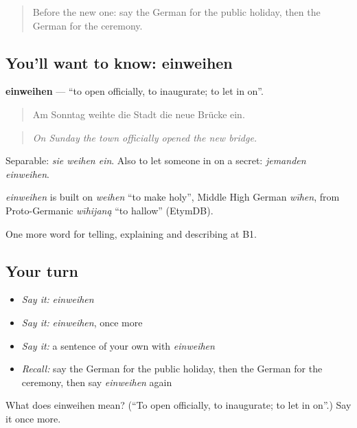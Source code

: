 \label{lesson:GE-C305-einweihen}



\begin{quote}
Before the new one: say the German for the public holiday, then the German for the ceremony.
\end{quote}

\subsection*{You'll want to know: einweihen}
\textbf{einweihen} — \textquotedblleft{}to open officially, to inaugurate; to let in on\textquotedblright{}.

\begin{quote}
Am Sonntag weihte die Stadt die neue Brücke ein.
\end{quote}

\begin{quote}
\emph{On Sunday the town officially opened the new bridge.}
\end{quote}

Separable: \emph{sie weihen ein}. Also to let someone in on a secret: \emph{jemanden einweihen}.

\begin{cousinweb}
\emph{einweihen} is built on \emph{weihen} \textquotedblleft{}to make holy\textquotedblright{}, Middle High German \emph{wīhen}, from Proto-Germanic \emph{wīhijaną} \textquotedblleft{}to hallow\textquotedblright{} (EtymDB).
\end{cousinweb}

\begin{grammarlens}[title={What you've built}]
One more word for telling, explaining and describing at B1.
\end{grammarlens}

\subsection*{Your turn}
\begin{itemize}
\raggedright
  \item \emph{Say it:} \emph{einweihen}
  \item \emph{Say it:} \emph{einweihen}, once more
  \item \emph{Say it:} a sentence of your own with \emph{einweihen}
  \item \emph{Recall:} say the German for the public holiday, then the German for the ceremony, then say \emph{einweihen} again
\end{itemize}

\begin{tcolorbox}[breakable,colback=teal!4,colframe=teal!35!black,title={Before you move on}]
What does einweihen mean? (\textquotedblleft{}To open officially, to inaugurate; to let in on\textquotedblright{}.) Say it once more.
\end{tcolorbox}
